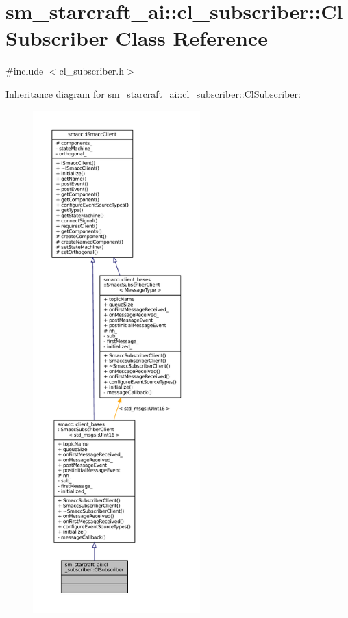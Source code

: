 \hypertarget{classsm__starcraft__ai_1_1cl__subscriber_1_1ClSubscriber}{}\section{sm\+\_\+starcraft\+\_\+ai\+:\+:cl\+\_\+subscriber\+:\+:Cl\+Subscriber Class Reference}
\label{classsm__starcraft__ai_1_1cl__subscriber_1_1ClSubscriber}


{\ttfamily \#include $<$cl\+\_\+subscriber.\+h$>$}



Inheritance diagram for sm\+\_\+starcraft\+\_\+ai\+:\+:cl\+\_\+subscriber\+:\+:Cl\+Subscriber\+:
\nopagebreak
\begin{figure}[H]
\begin{center}
\leavevmode
\includegraphics[height=550pt]{classsm__starcraft__ai_1_1cl__subscriber_1_1ClSubscriber__inherit__graph}
\end{center}
\end{figure}


